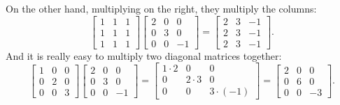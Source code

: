 On the other hand, multiplying on the right, they multiply the columns:
\begin{equation*}
\begin{bmatrix}
1 & 1 & 1 \\
1 & 1 & 1 \\
1 & 1 & 1 
\end{bmatrix}
\begin{bmatrix}
2 & 0 & 0 \\
0 & 3 & 0 \\
0 & 0 & -1
\end{bmatrix}
=
\begin{bmatrix}
2 & 3 & -1 \\
2 & 3 & -1 \\
2 & 3 & -1 
\end{bmatrix} .
\end{equation*}
And it is really easy to multiply two diagonal matrices together:
\begin{equation*}
\begin{bmatrix}
1 & 0 & 0 \\
0 & 2 & 0 \\
0 & 0 & 3 
\end{bmatrix}
\begin{bmatrix}
2 & 0 & 0 \\
0 & 3 & 0 \\
0 & 0 & -1
\end{bmatrix}
=
\begin{bmatrix}
1 \cdot 2 & 0 & 0 \\
0 & 2 \cdot 3 & 0 \\
0 & 0 & 3 \cdot (-1) 
\end{bmatrix}
=
\begin{bmatrix}
2 & 0 & 0 \\
0 & 6 & 0 \\
0 & 0 & -3 
\end{bmatrix} .
\end{equation*}

